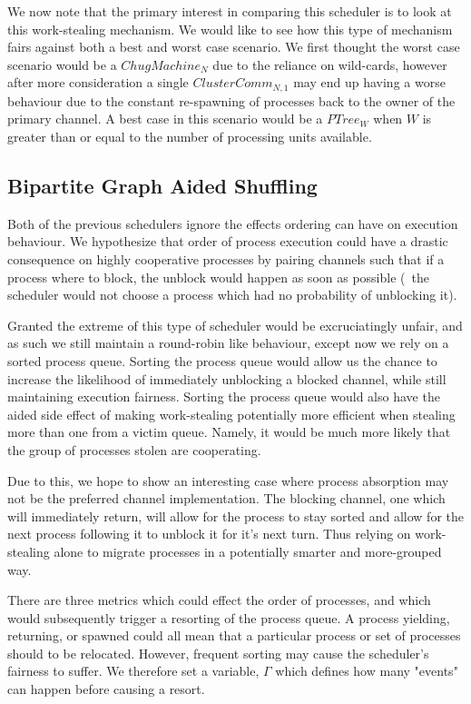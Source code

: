 We now note that the primary interest in comparing this scheduler is to look at 
this work-stealing mechanism.
We would like to see how this type of mechanism fairs against both a best and
worst case scenario. We first thought the worst case scenario would be a 
$ChugMachine_N$ due to the reliance on wild-cards, however after more 
consideration a single $ClusterComm_{N,1}$ may end up having a worse behaviour
due to the constant re-spawning of processes back to the owner of the primary
channel. A best case in this scenario would be a $PTree_W$ when $W$ is greater than or equal
to the number of processing units available.

\subsection{Bipartite Graph Aided Shuffling}
    \label{sec:bipartite graph aided shuffling}

Both of the previous schedulers ignore the effects ordering
can have on execution behaviour. We hypothesize that order of process execution
could have a drastic consequence on highly cooperative processes by pairing 
channels such that if a process where to block, the unblock would happen as soon
as possible (\ie~the scheduler would not choose a process which had no probability of unblocking it).

Granted the extreme of this type of scheduler would be excruciatingly unfair, and
as such we still maintain a round-robin like behaviour, except now we rely on 
a sorted process queue. Sorting the process queue would allow us the chance to 
increase the likelihood of immediately unblocking a blocked channel, while still
maintaining execution fairness. 
Sorting the process queue would also have the aided side effect of making 
work-stealing potentially more efficient when stealing more than one from a 
victim queue. Namely, it would be much more likely that the group of processes
stolen are cooperating. 

Due to this, we hope to show an interesting case where process absorption may 
not be the preferred channel implementation. The blocking channel, one which will
immediately return, will allow for the process to stay sorted and allow for the 
next process following it to unblock it for it's next turn. Thus relying on 
work-stealing alone to migrate processes in a potentially smarter and 
more-grouped way.

There are three metrics which could effect the order of processes, and which would
subsequently trigger a resorting of the process queue. A process yielding, 
returning, or spawned could all mean that a particular process or set of 
processes should to be relocated. However, frequent sorting may cause the scheduler's
fairness to suffer. We therefore set a variable, $\Gamma$ which defines how many 
"events" can happen before causing a resort.

